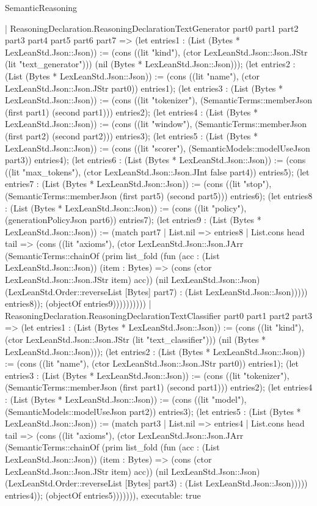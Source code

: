 \begin{lexlean}{SemanticReasoning}
\begin{semanticmodule}
{    | ReasoningDeclaration.ReasoningDeclarationTextGenerator part0 part1 part2 part3 part4 part5 part6 part7 => (let entries1 : (List (Bytes * LexLeanStd.Json::Json)) := (cons ((lit "kind"), (ctor LexLeanStd.Json::Json.JStr (lit "text_generator"))) (nil (Bytes * LexLeanStd.Json::Json))); (let entries2 : (List (Bytes * LexLeanStd.Json::Json)) := (cons ((lit "name"), (ctor LexLeanStd.Json::Json.JStr part0)) entries1); (let entries3 : (List (Bytes * LexLeanStd.Json::Json)) := (cons ((lit "tokenizer"), (SemanticTerms::memberJson (first part1) (second part1))) entries2); (let entries4 : (List (Bytes * LexLeanStd.Json::Json)) := (cons ((lit "window"), (SemanticTerms::memberJson (first part2) (second part2))) entries3); (let entries5 : (List (Bytes * LexLeanStd.Json::Json)) := (cons ((lit "scorer"), (SemanticModels::modelUseJson part3)) entries4); (let entries6 : (List (Bytes * LexLeanStd.Json::Json)) := (cons ((lit "max_tokens"), (ctor LexLeanStd.Json::Json.JInt false part4)) entries5); (let entries7 : (List (Bytes * LexLeanStd.Json::Json)) := (cons ((lit "stop"), (SemanticTerms::memberJson (first part5) (second part5))) entries6); (let entries8 : (List (Bytes * LexLeanStd.Json::Json)) := (cons ((lit "policy"), (generationPolicyJson part6)) entries7); (let entries9 : (List (Bytes * LexLeanStd.Json::Json)) := (match part7
      | List.nil => entries8
      | List.cons head tail => (cons ((lit "axioms"), (ctor LexLeanStd.Json::Json.JArr (SemanticTerms::chainOf (prim list_fold (fun (acc : (List LexLeanStd.Json::Json)) (item : Bytes) => (cons (ctor LexLeanStd.Json::Json.JStr item) acc)) (nil LexLeanStd.Json::Json) (LexLeanStd.Order::reverseList [Bytes] part7) : (List LexLeanStd.Json::Json))))) entries8)); (objectOf entries9))))))))))
    | ReasoningDeclaration.ReasoningDeclarationTextClassifier part0 part1 part2 part3 => (let entries1 : (List (Bytes * LexLeanStd.Json::Json)) := (cons ((lit "kind"), (ctor LexLeanStd.Json::Json.JStr (lit "text_classifier"))) (nil (Bytes * LexLeanStd.Json::Json))); (let entries2 : (List (Bytes * LexLeanStd.Json::Json)) := (cons ((lit "name"), (ctor LexLeanStd.Json::Json.JStr part0)) entries1); (let entries3 : (List (Bytes * LexLeanStd.Json::Json)) := (cons ((lit "tokenizer"), (SemanticTerms::memberJson (first part1) (second part1))) entries2); (let entries4 : (List (Bytes * LexLeanStd.Json::Json)) := (cons ((lit "model"), (SemanticModels::modelUseJson part2)) entries3); (let entries5 : (List (Bytes * LexLeanStd.Json::Json)) := (match part3
      | List.nil => entries4
      | List.cons head tail => (cons ((lit "axioms"), (ctor LexLeanStd.Json::Json.JArr (SemanticTerms::chainOf (prim list_fold (fun (acc : (List LexLeanStd.Json::Json)) (item : Bytes) => (cons (ctor LexLeanStd.Json::Json.JStr item) acc)) (nil LexLeanStd.Json::Json) (LexLeanStd.Order::reverseList [Bytes] part3) : (List LexLeanStd.Json::Json))))) entries4)); (objectOf entries5))))))),
  executable: true
}


\end{semanticmodule}
\end{lexlean}
